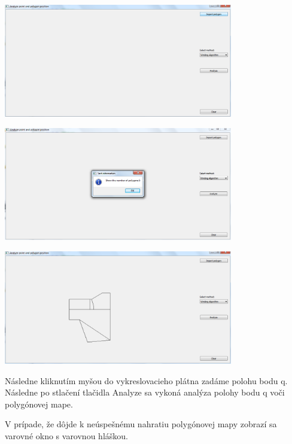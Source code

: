 \documentclass[12pt]{article}
\begin{document}
\begin{center}
   \includegraphics[width=10cm]{./img/import.png}
\end{center}

\begin{center}
   \includegraphics[width=10cm]{./img/import2.png}
\end{center}

\begin{center}
   \includegraphics[width=10cm]{./img/import3.png}
\end{center}

Následne kliknutím myšou do vykreslovacieho plátna zadáme polohu bodu q. Následne po stlačení tlačidla Analyze sa vykoná analýza polohy bodu q voči polygónovej mape.  

V prípade, že dôjde k neúspešnému nahratiu polygónovej mapy zobrazí sa varovné okno s varovnou hláškou.
\end{document}
